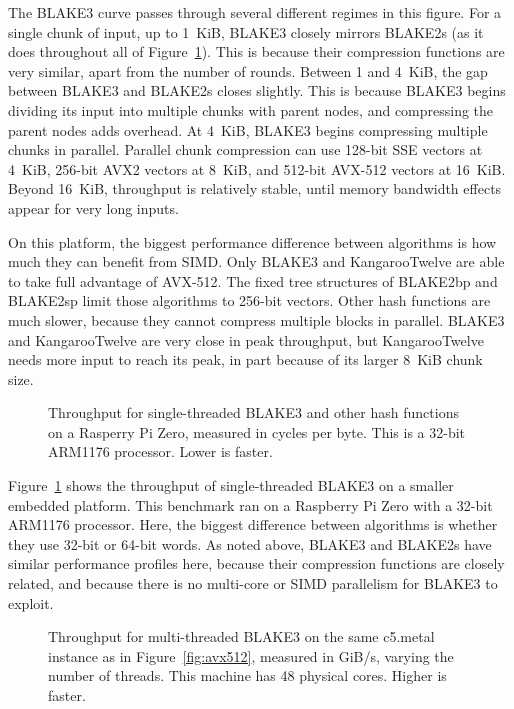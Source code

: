 \documentclass[11pt,notitlepage,a4paper]{article}
\begin{document}
The BLAKE3 curve passes through several different regimes in this figure. For a
single chunk of input, up to 1~KiB, BLAKE3 closely mirrors BLAKE2s (as it does
throughout all of Figure~\ref{fig:rpizero}). This is because their compression
functions are very similar, apart from the number of rounds. Between 1 and
4~KiB, the gap between BLAKE3 and BLAKE2s closes slightly. This is because
BLAKE3 begins dividing its input into multiple chunks with parent nodes, and
compressing the parent nodes adds overhead. At 4~KiB, BLAKE3 begins compressing
multiple chunks in parallel. Parallel chunk compression can use 128-bit SSE
vectors at 4~KiB, 256-bit AVX2 vectors at 8~KiB, and 512-bit AVX-512 vectors at
16~KiB. Beyond 16~KiB, throughput is relatively stable, until memory bandwidth
effects appear for very long inputs.

On this platform, the biggest performance difference between algorithms is how
much they can benefit from SIMD. Only BLAKE3 and KangarooTwelve are able to
take full advantage of AVX-512. The fixed tree structures of BLAKE2bp and
BLAKE2sp limit those algorithms to 256-bit vectors. Other hash functions are
much slower, because they cannot compress multiple blocks in parallel. BLAKE3
and KangarooTwelve are very close in peak throughput, but KangarooTwelve needs
more input to reach its peak, in part because of its larger 8~KiB chunk size.

\begin{figure}[h]
\centering
%

\caption{Throughput for single-threaded BLAKE3 and other hash functions on a
    Rasperry Pi Zero, measured in cycles per byte. This is a 32-bit ARM1176
    processor. Lower is faster.}%
\label{fig:rpizero}
\end{figure}

Figure~\ref{fig:rpizero} shows the throughput of single-threaded BLAKE3 on a
smaller embedded platform. This benchmark ran on a Raspberry Pi Zero with a
32-bit ARM1176 processor. Here, the biggest difference between algorithms is
whether they use 32-bit or 64-bit words. As noted above, BLAKE3 and BLAKE2s
have similar performance profiles here, because their compression functions are
closely related, and because there is no multi-core or SIMD parallelism for
BLAKE3 to exploit.

\begin{figure}[h]
\centering

    \caption{Throughput for multi-threaded BLAKE3 on the same c5.metal instance
    as in Figure~\ref{fig:avx512}, measured in GiB/s, varying the number of
    threads. This machine has 48 physical cores. Higher is faster.}%
\label{fig:threads}
\end{figure}
\end{document}
